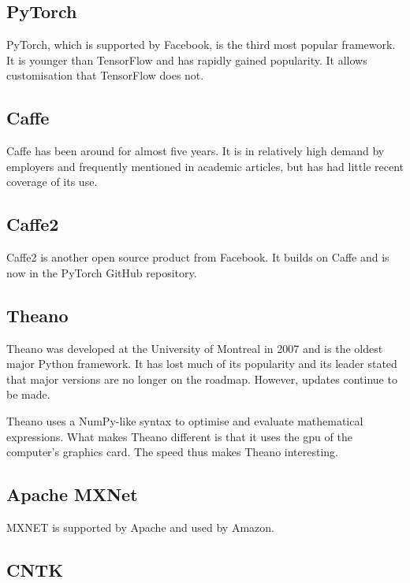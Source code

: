 \subsection{PyTorch}

PyTorch, which is supported by Facebook, is the third most popular framework. It is younger than TensorFlow and has rapidly gained popularity. It allows customisation that TensorFlow does not. \cite{PyTorch:2020}


\subsection{Caffe}

Caffe has been around for almost five years. It is in relatively high demand by employers and frequently mentioned in academic articles, but has had little recent coverage of its use.
\cite{Caffe:2020}

\subsection{Caffe2}

Caffe2 is another open source product from Facebook. It builds on Caffe and is now in the PyTorch GitHub repository. \cite{Caffe2:2020}

\subsection{Theano}

Theano was developed at the University of Montreal in 2007 and is the oldest major Python framework. It has lost much of its popularity and its leader stated that major versions are no longer on the roadmap. However, updates continue to be made. \cite{Theano:2016}

Theano uses a NumPy-like syntax to optimise and evaluate mathematical expressions. What makes Theano different is that it uses the \ac{gpu} of the computer's graphics card.
The speed thus makes Theano interesting.

\subsection{Apache MXNet}

MXNET is supported by Apache and used by Amazon. \cite{MXNet:2020}

\subsection{CNTK}

